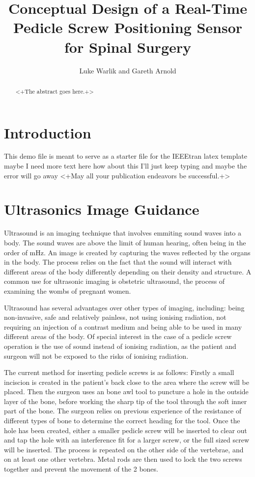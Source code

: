 \documentclass[conference, a4paper]{IEEEtran}
\begin{document}
%
\title{Conceptual Design of a Real-Time Pedicle Screw Positioning Sensor for
Spinal Surgery}
\author{Luke Warlik and Gareth Arnold}


\maketitle


\begin{abstract}
	<+The abstract goes here.+>
\end{abstract}


\section{Introduction}
This demo file is meant to serve as a starter file for the
IEEEtran latex template maybe I need more text here how about this
I'll just keep typing and maybe the error will go away
<+May all your publication endeavors be successful.+>

\section{Ultrasonics Image Guidance}
Ultrasound is an imaging technique that involves emmiting sound waves into a
body. The sound waves are above the limit of human hearing, often being in
the order of mHz. An image is created by capturing the waves reflected
by the organs in the body. 
The process relies on the fact that the sound will interact with
different areas of the body differently depending on their density and
structure. A common use for ultrasonic imaging is obstetric ultrasound,
the process of examining the wombs of pregnant women. 

Ultrasound has several advantages over other types of imaging, including:
being non-invasive, safe and relatively painless, not using ionising radiation,
not requiring an injection of a contrast medium and being able to be used in
many different areas of the body\cite{imagingExplained}. Of special interest
in the case of a 
pedicle screw operation is the use of sound instead of ionising radiation,
as the patient and surgeon will not be exposed to the risks of ionising
radiation. 

The current method for inserting pedicle screws is as follows: 
Firstly a small inciscion is created in the patient's back close to the area
where the screw will be placed. Then the surgeon uses an bone awl tool
to puncture a hole in the outside layer of the bone, before working the
sharp tip of the tool through the soft inner part of the bone. The surgeon
relies on previous experience of the resistance of different types of bone to
determine the correct heading for the tool. Once the hole has been created,
either a smaller pedicle screw will be inserted to clear out and tap the hole
with an interference fit for a larger screw, or the full sized screw will be
inserted. The process is repeated on the other side of the vertebrae, and 
on at least one other vertebra. Metal rods are then used to lock the two screws
together and prevent the movement of the 2 bones. 
\end{document}
